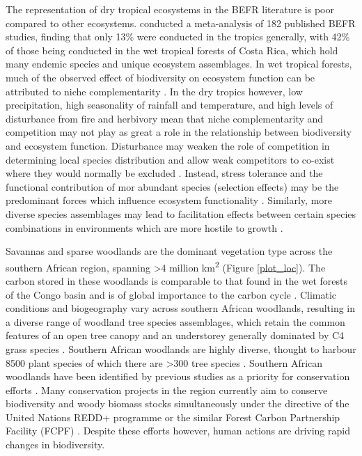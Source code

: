 \documentclass[11pt,a4paper]{article}
\begin{document}

The representation of dry tropical ecosystems in the BEFR literature is poor compared to other ecosystems. \citet{Clarke2017} conducted a meta-analysis of 182 published BEFR studies, finding that only 13\% were conducted in the tropics generally, with 42\% of those being conducted in the wet tropical forests of Costa Rica, which hold many endemic species and unique ecosystem assemblages. In wet tropical forests, much of the observed effect of biodiversity on ecosystem function can be attributed to niche complementarity \citep{Wright2017, Poorter2015, Sande2017a}. In the dry tropics however, low precipitation, high seasonality of rainfall and temperature, and high levels of disturbance from fire and herbivory mean that niche complementarity and competition may not play as great a role in the relationship between biodiversity and ecosystem function. Disturbance may weaken the role of competition in determining local species distribution and allow weak competitors to co-exist where they would normally be excluded \citep{Grime1979,Grace1990}. Instead, stress tolerance and the functional contribution of mor abundant species (selection effects) may be the predominant forces which influence ecosystem functionality \citep{Lasky2014, Tobner2016}. Similarly, more diverse species assemblages may lead to facilitation effects between certain species combinations in environments which are more hostile to growth \citep{Ratcliffe2017}.

Savannas and sparse woodlands are the dominant vegetation type across the southern African region, spanning >4 million km\textsuperscript{2} \citep{Ryan2016} (Figure \autoref{plot_loc}). The carbon stored in these woodlands is comparable to that found in the wet forests of the Congo basin and is of global importance to the carbon cycle \citep{Houghton2009, Mayaux2008}. Climatic conditions and biogeography vary across southern African woodlands, resulting in a diverse range of woodland tree species assemblages, which retain the common features of an open tree canopy and an understorey generally dominated by C4 grass species \citep{Frost1996}. Southern African woodlands are highly diverse, thought to harbour \textapprox{}8500 plant species of which there are >300 tree species \citep{Frost1996}. Southern African woodlands have been identified by previous studies as a priority for conservation efforts \citep{Byers2001, Mittermeier2003}. Many conservation projects in the region currently aim to conserve biodiversity and woody biomass stocks simultaneously under the directive of the United Nations REDD+ programme or the similar Forest Carbon Partnership Facility (FCPF) \citep{Hinsley2015}. Despite these efforts however, human actions are driving rapid changes in biodiversity. 
\end{document}
